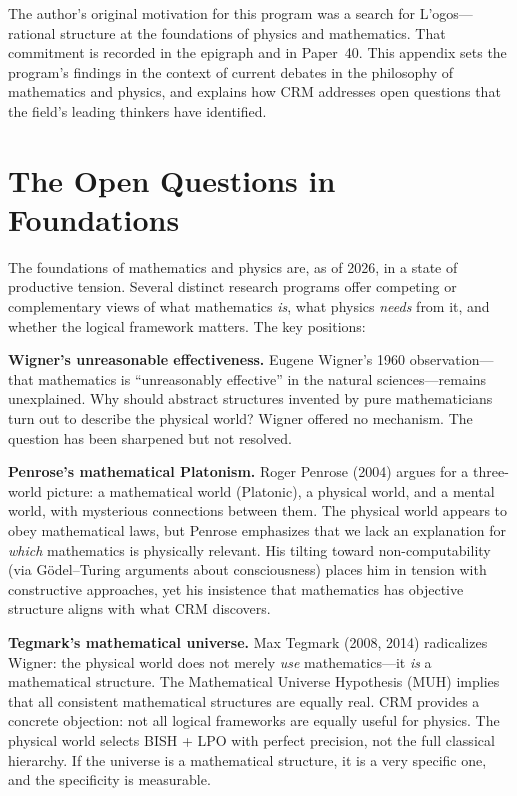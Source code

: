 \documentclass[11pt,twoside,openany]{report}
\theoremstyle{remark}
\newcommand{\BISH}{\textsf{BISH}}
\newcommand{\LPO}{\textsf{LPO}}
\begin{document}
\vspace{0.5cm}

\noindent The author's original motivation for this program was a search for \foreignlanguage{greek}{L'ogos}---rational structure at the foundations of physics and mathematics. That commitment is recorded in the epigraph and in Paper~40. This appendix sets the program's findings in the context of current debates in the philosophy of mathematics and physics, and explains how CRM addresses open questions that the field's leading thinkers have identified.

\section{The Open Questions in Foundations}

The foundations of mathematics and physics are, as of 2026, in a state of productive tension. Several distinct research programs offer competing or complementary views of what mathematics \emph{is}, what physics \emph{needs} from it, and whether the logical framework matters. The key positions:

\textbf{Wigner's unreasonable effectiveness.}
Eugene Wigner's 1960 observation---that mathematics is ``unreasonably effective'' in the natural sciences---remains unexplained. Why should abstract structures invented by pure mathematicians turn out to describe the physical world? Wigner offered no mechanism. The question has been sharpened but not resolved.

\textbf{Penrose's mathematical Platonism.}
Roger Penrose (2004) argues for a three-world picture: a mathematical world (Platonic), a physical world, and a mental world, with mysterious connections between them. The physical world appears to obey mathematical laws, but Penrose emphasizes that we lack an explanation for \emph{which} mathematics is physically relevant. His tilting toward non-computability (via G\"odel--Turing arguments about consciousness) places him in tension with constructive approaches, yet his insistence that mathematics has objective structure aligns with what CRM discovers.

\textbf{Tegmark's mathematical universe.}
Max Tegmark (2008, 2014) radicalizes Wigner: the physical world does not merely \emph{use} mathematics---it \emph{is} a mathematical structure. The Mathematical Universe Hypothesis (MUH) implies that all consistent mathematical structures are equally real. CRM provides a concrete objection: not all logical frameworks are equally useful for physics. The physical world selects \BISH{} + \LPO{} with perfect precision, not the full classical hierarchy. If the universe is a mathematical structure, it is a very specific one, and the specificity is measurable.
\end{document}
